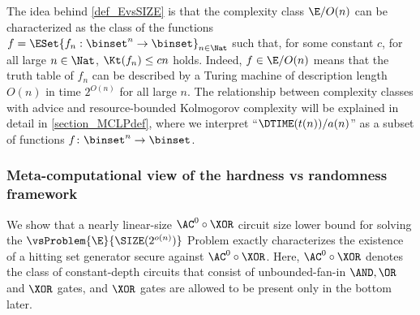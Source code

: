 \documentclass[11pt]{article}
\numberwithin{equation}{section}
\theoremstyle{definition}
\theoremstyle{plain}
\begin{document}
The idea behind \cref{def_EvsSIZE} is that
the complexity class $\E / O(n)$ can be characterized as
the class of the functions $f = \ESet{f_n : \binset^n \to \binset}_{n\in\Nat}$
such that,
for some constant $c$, for all large $n \in \Nat$,
$\Kt(f_n) \le c n$ holds.
Indeed, $f \in \E / O(n)$ means that the truth table of $f_n$ can be described by a Turing machine of description length $O(n)$ in time $2^{O(n)}$ for all large $n$.
%
The relationship between complexity classes with advice and resource-bounded Kolmogorov complexity
will be explained in detail in \cref{section_MCLPdef},
where we interpret ``$\DTIME(t(n))/a(n)$'' as a subset of functions $f \colon \binset^n \to \binset$.
%


\subsubsection{Meta-computational view of the hardness vs randomness framework}
%
%
We show that a nearly linear-size $\AC^0 \circ \XOR$ circuit size lower bound for
solving the $\vsProblem{\E}{\SIZE(2^{o(n)})}$ Problem
exactly characterizes
the existence of a hitting set generator secure against $\AC^0 \circ \XOR$.
%
%
Here, $\AC^0 \circ \XOR$ denotes the class of constant-depth circuits that consist of unbounded-fan-in $\AND, \OR$ and $\XOR$ gates, and $\XOR$ gates are allowed to be present only in the bottom later.
\end{document}
